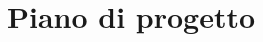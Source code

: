 \documentclass[12pt]{article}
\title{Piano di progetto}
\begin{document}
	\makefirstpage
	
	
	\clearpage
	
	\tableofcontents
	\clearpage
	
	
	
	
	
\end{document}

